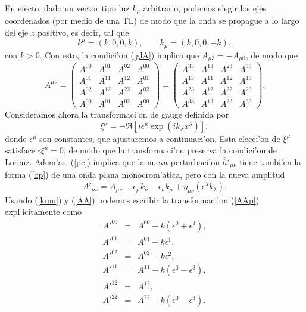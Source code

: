 En efecto, dado un vector tipo luz $k_\mu$ arbitrario, podemos elegir los ejes coordenados (por medio de una TL) de modo que la onda se propague a lo largo del eje $z$ positivo, es decir, tal que
\begin{equation}\label{kmu}
 k^\mu=(k,0,0,k), \qquad k_\mu=(k,0,0,-k),
\end{equation}
con $k>0$. Con esto, la condici'on (\ref{glA}) implica que $A_{\mu 3}=-A_{\mu 0}$, de modo que
\begin{equation}\label{AA}
 A^{\mu\nu}=\left(\begin{array}{cccc}
A^{00} & A^{01} & A^{02} & A^{00} \\
A^{01} & A^{11} & A^{12} & A^{01} \\
A^{02} & A^{12} & A^{22} & A^{02} \\
A^{00} & A^{01} & A^{02} & A^{00} \end{array}
\right)=\left(\begin{array}{cccc}
A^{33} & A^{13} & A^{23} & A^{33} \\
A^{13} & A^{11} & A^{12} & A^{13} \\
A^{23} & A^{12} & A^{22} & A^{23} \\
A^{33} & A^{13} & A^{23} & A^{33} \end{array}
\right).
\end{equation}
Consideramos ahora la transformaci'on de gauge definida por
\begin{equation}\label{xiOP}
 \xi^\mu=-\Re\left[i\epsilon^\mu\exp{(ik_\lambda x^\lambda)}\right],
\end{equation}
donde $\epsilon^\mu$ son constantes, que ajustaremos a continuaci'on. Esta elecci'on de $\xi^\mu$ satisface $\square\xi^\mu=0$, de modo que la transformaci'on preserva la condici'on de Lorenz. Adem'as, (\ref{pc}) implica que la nueva perturbaci'on $\bar{h}'_{\mu\nu}$ tiene tambi'en la forma (\ref{op}) de una onda plana monocrom'atica, pero con la nueva amplitud
\begin{equation}\label{AAp}
 A'_{\mu\nu}=A_{\mu\nu}-\epsilon_\mu k_\nu-\epsilon_\nu k_\mu+\eta_{\mu\nu}(\epsilon^\lambda k_\lambda).
\end{equation}
Usando (\ref{kmu}) y (\ref{AA}) podemos escribir la transformaci'on (\ref{AAp}) expl'icitamente como
\begin{eqnarray}
A'^{00}&=&A^{00}-k(\epsilon^0+\epsilon^3),\\
A'^{01}&=&A^{01}-k\epsilon^1,\\
A'^{02}&=&A^{02}-k\epsilon^2,\\
A'^{11}&=&A^{11}-k(\epsilon^0-\epsilon^3),\\
A'^{12}&=&A^{12},\\
A'^{22}&=&A^{22}-k(\epsilon^0-\epsilon^3).
\end{eqnarray}

